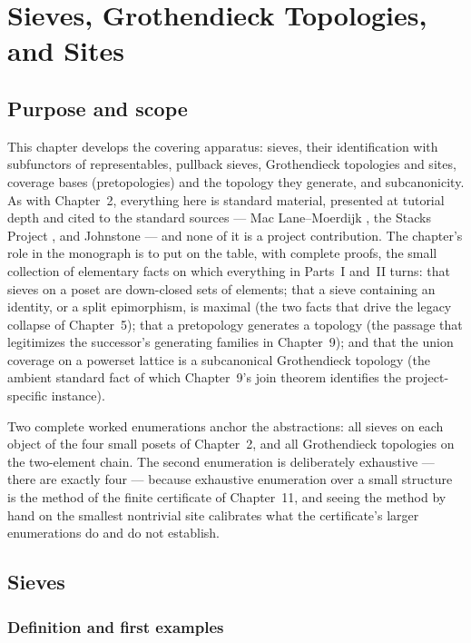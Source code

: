 \chapter{Sieves, Grothendieck Topologies, and Sites}\label{ch03:chap}

\section{Purpose and scope}\label{ch03:sec:purpose}

This chapter develops the covering apparatus: sieves, their
identification with subfunctors of representables, pullback sieves,
Grothendieck topologies and sites, coverage bases (pretopologies) and the
topology they generate, and subcanonicity. As with Chapter~2, everything
here is standard material, presented at tutorial depth and cited to the
standard sources --- Mac Lane--Moerdijk \cite{maclane}, the Stacks
Project \cite{stacks00ZC,stacks00W1,stacks00WO}, and Johnstone
\cite{johnstone} --- and none of it is a project contribution. The
chapter's role in the monograph is to put on the table, with complete
proofs, the small collection of elementary facts on which everything in
Parts~I and~II turns: that sieves on a poset are down-closed sets of
elements; that a sieve containing an identity, or a split epimorphism,
is maximal (the two facts that drive the legacy collapse of Chapter~5);
that a pretopology generates a topology (the passage that legitimizes
the successor's generating families in Chapter~9); and that the union
coverage on a powerset lattice is a subcanonical Grothendieck topology
(the ambient standard fact of which Chapter~9's join theorem identifies
the project-specific instance).

Two complete worked enumerations anchor the abstractions: all sieves on
each object of the four small posets of Chapter~2, and all Grothendieck
topologies on the two-element chain. The second enumeration is
deliberately exhaustive --- there are exactly four --- because
exhaustive enumeration over a small structure is the method of the
finite certificate of Chapter~11, and seeing the method by hand on the
smallest nontrivial site calibrates what the certificate's larger
enumerations do and do not establish.

\section{Sieves}\label{ch03:sec:sieves}

\subsection{Definition and first examples}\label{ch03:sec:sieve-def}

